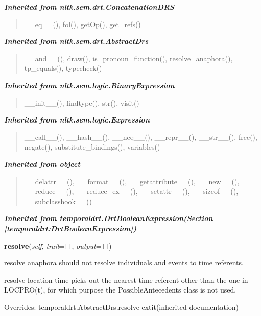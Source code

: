 \large{\textbf{\textit{Inherited from nltk.sem.drt.ConcatenationDRS}}}

\begin{quote}
\_\_eq\_\_(), fol(), getOp(), get\_refs()
\end{quote}

\large{\textbf{\textit{Inherited from nltk.sem.drt.AbstractDrs}}}

\begin{quote}
\_\_and\_\_(), draw(), is\_pronoun\_function(), resolve\_anaphora(), tp\_equals(), typecheck()
\end{quote}

\large{\textbf{\textit{Inherited from nltk.sem.logic.BinaryExpression}}}

\begin{quote}
\_\_init\_\_(), findtype(), str(), visit()
\end{quote}

\large{\textbf{\textit{Inherited from nltk.sem.logic.Expression}}}

\begin{quote}
\_\_call\_\_(), \_\_hash\_\_(), \_\_neq\_\_(), \_\_repr\_\_(), \_\_str\_\_(), free(), negate(), substitute\_bindings(), variables()
\end{quote}

\large{\textbf{\textit{Inherited from object}}}

\begin{quote}
\_\_delattr\_\_(), \_\_format\_\_(), \_\_getattribute\_\_(), \_\_new\_\_(), \_\_reduce\_\_(), \_\_reduce\_ex\_\_(), \_\_setattr\_\_(), \_\_sizeof\_\_(), \_\_subclasshook\_\_()
\end{quote}

\large{\textbf{\textit{Inherited from temporaldrt.DrtBooleanExpression\textit{(Section \ref{temporaldrt:DrtBooleanExpression})}}}}

    \vspace{0.5ex}

\hspace{.8\funcindent}\begin{boxedminipage}{\funcwidth}

    \raggedright \textbf{resolve}(\textit{self}, \textit{trail}={\tt \texttt{[}\texttt{]}}, \textit{output}={\tt \texttt{[}\texttt{]}})

\setlength{\parskip}{2ex}
    resolve anaphora should not resolve individuals and events to time 
    referents.

    resolve location time picks out the nearest time referent other than 
    the one in LOCPRO(t), for which purpose the PossibleAntecedents class 
    is not used.

\setlength{\parskip}{1ex}
      Overrides: temporaldrt.AbstractDrs.resolve 	extit{(inherited documentation)}

    \end{boxedminipage}



